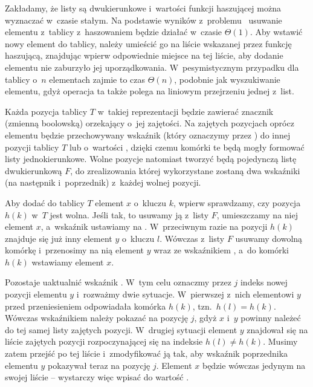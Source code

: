\exercise %
Zakładamy, że listy są dwukierunkowe i~wartości funkcji haszującej można wyznaczać w~czasie stałym.
Na podstawie wyników z~problemu~ usuwanie elementu z~tablicy z~haszowaniem będzie działać w~czasie $\Theta(1)$.
Aby wstawić nowy element do tablicy, należy umieścić go na liście wskazanej przez funkcję haszującą, znajdując wpierw odpowiednie miejsce na tej liście, aby dodanie elementu nie zaburzyło jej uporządkowania.
W~pesymistycznym przypadku dla tablicy o~$n$ elementach zajmie to czas $\Theta(n)$, podobnie jak wyszukiwanie elementu, gdyż operacja ta także polega na liniowym przejrzeniu jednej z~list.

\exercise %
Każda pozycja tablicy $T$ w~takiej reprezentacji będzie zawierać znacznik (zmienną boolowską) orzekający o~jej zajętości.
Na zajętych pozycjach oprócz elementu będzie przechowywany wskaźnik (który oznaczymy przez ) do innej pozycji tablicy $T$ lub o~wartości , dzięki czemu komórki te będą mogły formować listy jednokierunkowe.
Wolne pozycje natomiast tworzyć będą pojedynczą listę dwukierunkową $F$, do zrealizowania której wykorzystane zostaną dwa wskaźniki (na następnik i~poprzednik) z~każdej wolnej pozycji.

Aby dodać do tablicy $T$ element $x$ o~kluczu $k$, wpierw sprawdzamy, czy pozycja $h(k)$ w~$T$ jest wolna.
Jeśli tak, to usuwamy ją z~listy $F$, umieszczamy na niej element $x$, a~wskaźnik  ustawiamy na .
W~przeciwnym razie na pozycji $h(k)$ znajduje się już inny element $y$ o~kluczu $l$.
Wówczas z~listy $F$ usuwamy dowolną komórkę i~przenosimy na nią element $y$ wraz ze wskaźnikiem , a~do komórki $h(k)$ wstawiamy element $x$.

Pozostaje uaktualnić wskaźnik .
W~tym celu oznaczmy przez $j$ indeks nowej pozycji elementu $y$ i~rozważmy dwie sytuacje.
W~pierwszej z~nich elementowi $y$ przed przeniesieniem odpowiadała komórka $h(k)$, tzn.\ $h(l)=h(k)$.
Wówczas wskaźnikiem  należy pokazać na pozycję $j$, gdyż $x$ i~$y$ powinny należeć do tej samej listy zajętych pozycji.
W~drugiej sytuacji element $y$ znajdował się na liście zajętych pozycji rozpoczynającej się na indeksie $h(l)\ne h(k)$.
Musimy zatem przejść po tej liście i~zmodyfikować ją tak, aby wskaźnik  poprzednika elementu $y$ pokazywał teraz na pozycję $j$.
Element $x$ będzie wówczas jedynym na swojej liście -- wystarczy więc wpisać do  wartość .


